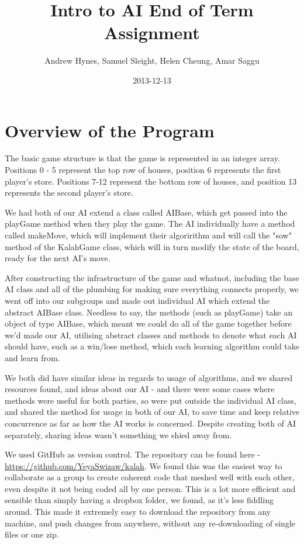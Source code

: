 \documentclass[11pt]{article}
\author{Andrew Hynes, Samuel Sleight, Helen Cheung, Amar Saggu}
\date{2013-12-13}
\title{Intro to AI End of Term Assignment}
\begin{document}
\maketitle
\tableofcontents


\section{Overview of the Program}
\label{sec-1}

The basic game structure is that the game is represented in an integer array. Positions 0 - 5 represent the top row of houses, position 6 represents the first player's store. Positions 7-12 represent the bottom row of houses, and position 13 represents the second player's store.

We had both of our AI extend a class called AIBase, which get passed into the playGame method when they play the game. The AI individually have a method called makeMove, which will implement their algoririthm and will call the "sow" method of the KalahGame class, which will in turn modify the state of the board, ready for the next AI's move.

After constructing the infrastructure of the game and whatnot, including the base AI class and all of the plumbing for making sure everything connects properly, we went off into our subgroups and made out individual AI which extend the abstract AIBase class. Needless to say, the methods (such as playGame) take an object of type AIBase, which meant we could do all of the game together before we'd made our AI, utilising abstract classes and methods to denote what each AI should have, such as a win/lose method, which each learning algorithm could take and learn from.

We both did have similar ideas in regards to usage of algorithms, and we shared resources found, and ideas about our AI - and there were some cases where methods were useful for both parties, so were put outside the individual AI class, and shared the method for usage in both of our AI, to save time and keep relative concurrence as far as how the AI works is concerned. Despite creating both of AI separately, sharing ideas wasn't something we shied away from.

We used GitHub as version control. The repository can be found here - \url{https://github.com/YeyaSwizaw/kalah}. We found this was the easiest way to collaborate as a group to create coherent code that meshed well with each other, even despite it not being coded all by one person. This is a lot more efficient and sensible than simply having a dropbox folder, we found, as it's less fiddling around. This made it extremely easy to download the repository from any machine, and push changes from anywhere, without any re-downloading of single files or one zip.
\end{document}
